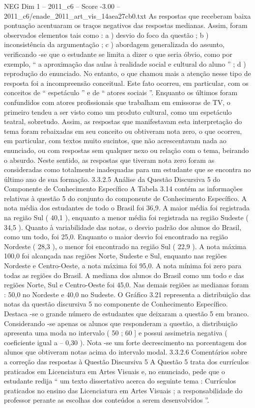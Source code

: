 \begin{textsample}{NEG Dim 1 – 2011\_c6 – Score -3.00 – 2011\_c6/enade\_2011\_art\_vis\_14aea27cb0.txt}
As respostas que receberam baixa pontuação acentuaram os traços negativos das respostas medianas.
Assim, foram observados elementos tais como : a ) desvio do foco da questão ; b ) inconsistência da argumentação ; c ) abordagem generalizada do assunto, verificando -se que o estudante se limita a dizer o que seria óbvio, como por exemplo, “ a aproximação das aulas à realidade social e cultural do aluno ” ; d ) reprodução do enunciado.
No entanto, o que chamou mais a atenção nesse tipo de resposta foi a incompreensão conceitual.
Este fato ocorreu, em particular, com os conceitos de “ espetáculo ” e de “ atores sociais ”.
Enquanto os últimos foram confundidos com atores profissionais que trabalham em emissoras de TV, o primeiro tendeu a ser visto como um produto cultural, como um espetáculo teatral, sobretudo.
Assim, as respostas que manifestavam esta interpretação do tema foram rebaixadas em seu conceito ou obtiveram nota zero, o que ocorreu, em particular, com textos muito sucintos, que não acrescentavam nada ao enunciado, ou com respostas sem qualquer nexo ou relação com o tema, beirando o absurdo.
Neste sentido, as respostas que tiveram nota zero foram as consideradas como totalmente inadequadas para um estudante que se encontra no último ano de sua formação. 3.3.2.5 Análise da Questão Discursiva 5 do Componente de Conhecimento Específico A Tabela 3.14 contém as informações relativas à questão 5 do conjunto do componente de Conhecimento Específico.
A nota média dos estudantes de todo o Brasil foi 36,9.
A maior média foi registrada na região Sul ( 40,1 ), enquanto a menor média foi registrada na região Sudeste ( 34,5 ).
Quanto à variabilidade das notas, o desvio padrão dos alunos do Brasil, como um todo, foi 25,0.
Enquanto o maior desvio foi encontrado na região Nordeste ( 28,3 ), o menor foi encontrado na região Sul ( 22,9 ).
A nota máxima 100,0 foi alcançada nas regiões Norte, Sudeste e Sul, enquanto nas regiões Nordeste e Centro-Oeste, a nota máxima foi 95,0.
A nota mínima foi zero para todas as regiões do Brasil.
A mediana dos alunos do Brasil como um todo e das regiões Norte, Sul e Centro-Oeste foi 45,0.
Nas demais regiões as medianas foram : 50,0 no Nordeste e 40,0 no Sudeste.
O Gráfico 3.21 representa a distribuição das notas da questão discursiva 5 no componente de Conhecimento Específico.
Destaca -se o grande número de estudantes que deixaram a questão 5 em branco.
Considerando -se apenas os alunos que responderam a questão, a distribuição apresenta uma moda no intervalo ( 50 ; 60 ] e possui assimetria negativa ( coeficiente igual a – 0,30 ).
Nota -se um forte decrescimento na porcentagem dos alunos que obtiveram notas acima do intervalo modal. 3.3.2.6 Comentários sobre a correção das respostas à Questão Discursiva 5 A Questão 5 trata dos currículos praticados em Licenciatura em Artes Visuais e, no enunciado, pede que o estudante redija “ um texto dissertativo acerca do seguinte tema : Currículos praticados no ensino das Licenciatura em Artes Visuais ; a responsabilidade do professor perante as escolhas dos conteúdos a serem desenvolvidos ”.

\end{textsample}
